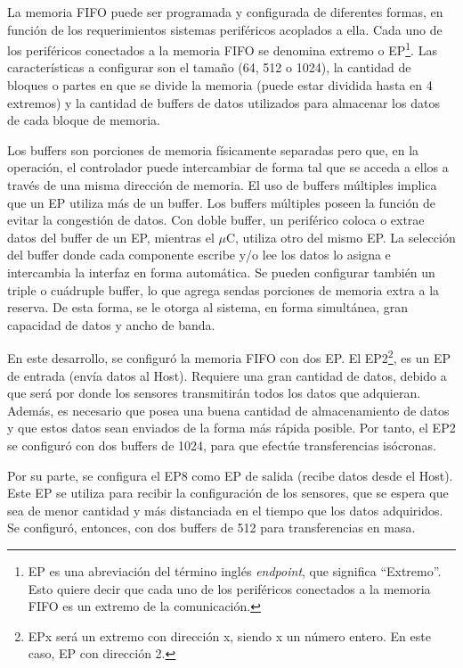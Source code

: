 	La memoria FIFO puede ser programada y configurada de diferentes formas, en función de los requerimientos sistemas periféricos acoplados a ella. Cada uno de los periféricos conectados a la memoria FIFO se denomina extremo o EP\footnote{EP es una abreviación del término inglés {\it endpoint}, que significa ``Extremo''. Esto quiere decir que cada uno de los periféricos conectados a la memoria FIFO es un extremo de la comunicación.}. Las características a configurar son el tamaño (\si{64}, \si{512} o \SI{1024}{\byte}), la cantidad de bloques o partes en que se divide la memoria (puede estar dividida hasta en 4 extremos) y la cantidad de buffers de datos utilizados para almacenar los datos de cada bloque de memoria.
	
	Los buffers son porciones de memoria físicamente separadas pero que, en la operación, el controlador puede intercambiar de forma tal que se acceda a ellos a través de una misma dirección de memoria. El uso de buffers múltiples implica que un EP utiliza más de un buffer. Los buffers múltiples poseen la función de evitar la congestión de datos. Con doble buffer, un periférico coloca o extrae datos del buffer de un EP, mientras el $\mu$C, utiliza otro del mismo EP. La selección del buffer donde cada componente escribe y/o lee los datos lo asigna e intercambia la interfaz en forma automática. Se pueden configurar también un triple o cuádruple buffer, lo que agrega sendas porciones de memoria extra a la reserva. De esta forma, se le otorga al sistema, en forma simultánea, gran capacidad de datos y ancho de banda.
	
	En este desarrollo, se configuró la memoria FIFO con dos EP. El EP2\footnote{EPx será un extremo con dirección x, siendo x un número entero. En este caso, EP con dirección 2.}, es un EP de entrada (envía datos al Host). Requiere una gran cantidad de datos, debido a que será por donde los sensores transmitirán todos los datos que adquieran. Además, es necesario que posea una buena cantidad de almacenamiento de datos y que estos datos sean enviados de la forma más rápida posible. Por tanto, el EP2 se configuró con dos buffers de \SI{1024}{\byte}, para que efectúe transferencias isócronas.
	
	Por su parte, se configura el EP8 como EP de salida (recibe datos desde el Host). Este EP se utiliza para recibir la configuración de los sensores, que se espera que sea de menor cantidad y más distanciada en el tiempo que los datos adquiridos. Se configuró, entonces, con dos buffers de \SI{512}{\byte} para transferencias en masa.
	
